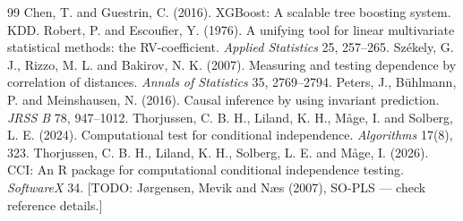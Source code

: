 \documentclass[10pt,leqno]{amsart}
\newcommand{\todo}[1]{{\color{red}[TODO: #1]}}
\begin{document}
\begin{thebibliography}{99}
 Chen, T. and Guestrin, C. (2016). XGBoost: A scalable tree boosting system. KDD.
 Robert, P. and Escoufier, Y. (1976). A unifying tool for linear multivariate statistical methods: the RV-coefficient. \emph{Applied Statistics} 25, 257--265.
 Sz\'ekely, G. J., Rizzo, M. L. and Bakirov, N. K. (2007). Measuring and testing dependence by correlation of distances. \emph{Annals of Statistics} 35, 2769--2794.
 Peters, J., B\"uhlmann, P. and Meinshausen, N. (2016). Causal inference by using invariant prediction. \emph{JRSS B} 78, 947--1012.
 Thorjussen, C. B. H., Liland, K. H., M\aa ge, I. and Solberg, L. E. (2024). Computational test for conditional independence. \emph{Algorithms} 17(8), 323.
 Thorjussen, C. B. H., Liland, K. H., Solberg, L. E. and M\aa ge, I. (2026). CCI: An R package for computational conditional independence testing. \emph{SoftwareX} 34.
 \todo{J{\o}rgensen, Mevik and N\ae s (2007), SO-PLS --- check reference details.}

\end{thebibliography}
\end{document}
